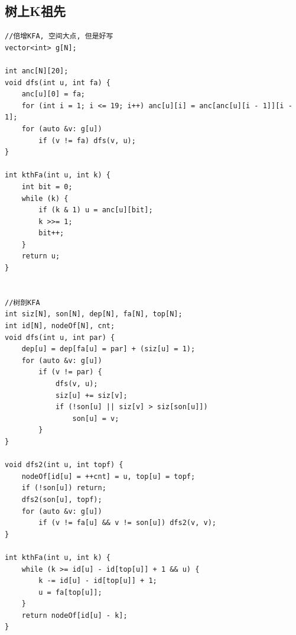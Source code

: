 \documentclass[twoside]{article}
\begin{document}
\subsection{树上K祖先}
\begin{lstlisting}
//倍增KFA, 空间大点, 但是好写
vector<int> g[N];

int anc[N][20];
void dfs(int u, int fa) {
    anc[u][0] = fa;
    for (int i = 1; i <= 19; i++) anc[u][i] = anc[anc[u][i - 1]][i - 1];
    for (auto &v: g[u])
        if (v != fa) dfs(v, u);
}

int kthFa(int u, int k) {
    int bit = 0;
    while (k) {
        if (k & 1) u = anc[u][bit];
        k >>= 1;
        bit++;
    }
    return u;
}


//树剖KFA
int siz[N], son[N], dep[N], fa[N], top[N];
int id[N], nodeOf[N], cnt;
void dfs(int u, int par) {
    dep[u] = dep[fa[u] = par] + (siz[u] = 1);
    for (auto &v: g[u])
        if (v != par) {
            dfs(v, u);
            siz[u] += siz[v];
            if (!son[u] || siz[v] > siz[son[u]])
                son[u] = v;
        }
}

void dfs2(int u, int topf) {
    nodeOf[id[u] = ++cnt] = u, top[u] = topf;
    if (!son[u]) return;
    dfs2(son[u], topf);
    for (auto &v: g[u])
        if (v != fa[u] && v != son[u]) dfs2(v, v);
}

int kthFa(int u, int k) {
    while (k >= id[u] - id[top[u]] + 1 && u) {
        k -= id[u] - id[top[u]] + 1;
        u = fa[top[u]];
    }
    return nodeOf[id[u] - k];
}\end{lstlisting}
\end{document}
